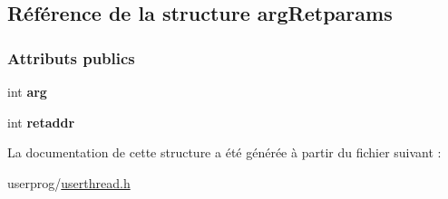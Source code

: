 \hypertarget{structarg_retparams}{}\subsection{Référence de la structure arg\+Retparams}
\label{structarg_retparams}
\subsubsection*{Attributs publics}
\begin{DoxyCompactItemize}
\item 
\hypertarget{structarg_retparams_aa0c7add18d6a0b8b0c6b88dd2711222b}{}\label{structarg_retparams_aa0c7add18d6a0b8b0c6b88dd2711222b} 
int {\bfseries arg}
\item 
\hypertarget{structarg_retparams_a7bc7e76867d0f81bc51eab58d18dedde}{}\label{structarg_retparams_a7bc7e76867d0f81bc51eab58d18dedde} 
int {\bfseries retaddr}
\end{DoxyCompactItemize}


La documentation de cette structure a été générée à partir du fichier suivant \+:\begin{DoxyCompactItemize}
\item 
userprog/\hyperlink{userthread_8h}{userthread.\+h}\end{DoxyCompactItemize}

